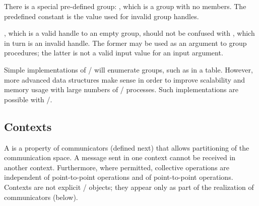 There is a special pre-defined group: , which is
a group with no members.
The predefined constant
 is the value used for invalid group handles.

\begin{users}
, which is a valid handle to an empty group,
should not be confused with , which in turn is
an invalid handle. The former may be used as an argument to group
procedures; the latter is not a valid input value for an input argument.
\end{users}

\begin{implementors}
Simple implementations of \MPI/ will enumerate groups, such as in a
table. However, more advanced data structures make sense in order
to improve scalability and memory usage with large numbers of \MPI/ processes.
Such implementations are possible with \MPI/.
\end{implementors}

\subsection{Contexts}
\label{sec:context:contexts}
A  is a property of communicators (defined next) that allows
partitioning of the communication space. A message sent in one context cannot
be received in another context. Furthermore, where permitted, collective
operations are independent of  point-to-point operations
and  of
point-to-point operations.
Contexts are not explicit \MPI/ objects; they appear only as part of
the realization of communicators (below).

